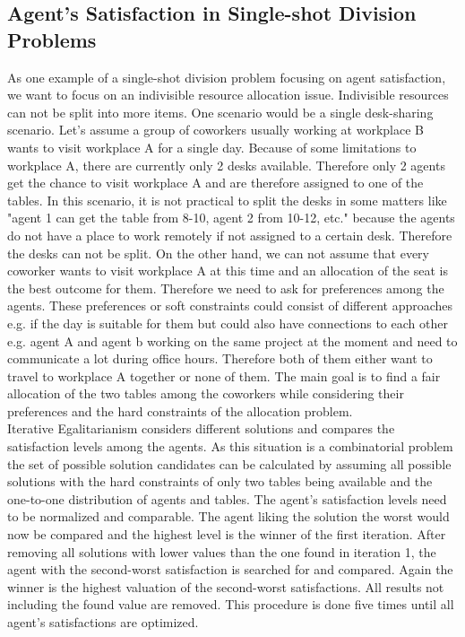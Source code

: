 \documentclass[german, a4paper, 11pt, oneside]{scrbook}
\begin{document}
\subsection{Agent's Satisfaction in Single-shot Division Problems}
As one example of a single-shot division problem focusing on agent satisfaction, we want to focus on an indivisible resource allocation issue.
Indivisible resources can not be split into more items. One scenario would be a single desk-sharing scenario. Let's assume a group of coworkers usually working at workplace B wants to visit workplace A for a single day. Because of some limitations to workplace A, there are currently only 2 desks available. Therefore only 2 agents get the chance to visit workplace A and are therefore assigned to one of the tables. In this scenario, it is not practical to split the desks in some matters like "agent 1 can get the table from 8-10, agent 2 from 10-12, etc." because the agents do not have a place to work remotely if not assigned to a certain desk. Therefore the desks can not be split. On the other hand, we can not assume that every coworker wants to visit workplace A at this time and an allocation of the seat is the best outcome for them. Therefore we need to ask for preferences among the agents. These preferences or soft constraints could consist of different approaches e.g. if the day is suitable for them but could also have connections to each other e.g. agent A and agent b working on the same project at the moment and need to communicate a lot during office hours. Therefore both of them either want to travel to workplace A together or none of them. The main goal is to find a fair allocation of the two tables among the coworkers while considering their preferences and the hard constraints of the allocation problem.
\\Iterative Egalitarianism considers different solutions and compares the satisfaction levels among the agents. As this situation is a combinatorial problem the set of possible solution candidates can be calculated by assuming all possible solutions with the hard constraints of only two tables being available and the one-to-one distribution of agents and tables. The agent's satisfaction levels need to be normalized and comparable. The agent liking the solution the worst would now be compared and the highest level is the winner of the first iteration. After removing all solutions with lower values than the one found in iteration 1, the agent with the second-worst satisfaction is searched for and compared. Again the winner is the highest valuation of the second-worst satisfactions. All results not including the found value are removed. This procedure is done five times until all agent's satisfactions are optimized. 
\end{document}
